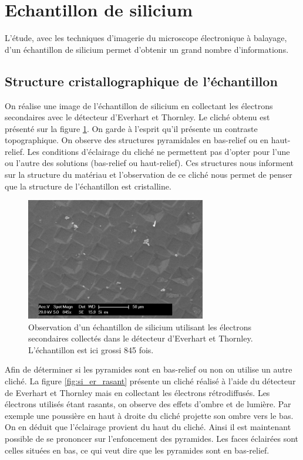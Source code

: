 \documentclass[a4paper,12pt]{article}
\newcommand\ett{Everhart et Thornley\xspace}
\begin{document}
\section{Echantillon de silicium}

L'étude, avec les techniques d'imagerie du microscope électronique à balayage, d'un échantillon de silicium permet d'obtenir un grand nombre d'informations.

\subsection{Structure cristallographique de l'échantillon}

On réalise une image de l'échantillon de silicium en collectant les électrons secondaires avec le détecteur d'\ett.
Le cliché obtenu est présenté sur la figure \ref{fig:si_es}. On garde à l'esprit qu'il présente un contraste topographique.
On observe des structures pyramidales en bas-relief ou en haut-relief. Les conditions d'éclairage du cliché ne permettent
pas d'opter pour l'une ou l'autre des solutions (bas-relief ou haut-relief). Ces structures nous informent sur la structure
du matériau et l'observation de ce cliché nous permet de penser que la structure de l'échantillon est cristalline.



\begin{figure}
\centering
\includegraphics[width=0.7\textwidth]{images/si_es.png}
\caption{Observation d'un échantillon de silicium utilisant les électrons secondaires collectés dans le détecteur d'\ett. L'échantillon est ici grossi 845 fois.}
\label{fig:si_es}
\end{figure}

Afin de déterminer si les pyramides sont en bas-relief ou non on utilise un autre cliché. La figure \ref{fig:si_er_rasant} présente
un cliché réalisé à l'aide du détecteur de \ett mais en collectant les électrons rétrodiffusés. Les électrons utilisés étant rasants,
on observe des effets d'ombre et de lumière. Par exemple une poussière en haut à droite du cliché projette son ombre vers le bas.
On en déduit que l'éclairage provient du haut du cliché. Ainsi il est maintenant possible de se prononcer sur l'enfoncement des pyramides.
Les faces éclairées sont celles situées en bas, ce qui veut dire que les pyramides sont en bas-relief.
\end{document}
